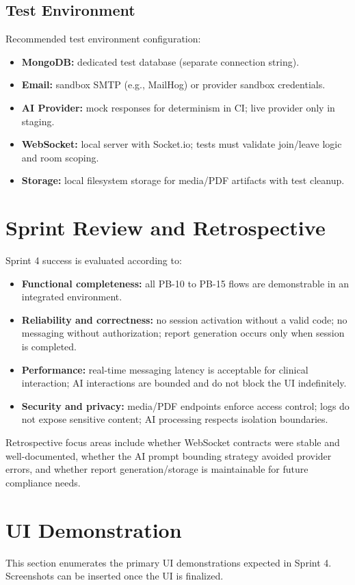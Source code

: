 \documentclass[12pt]{article}
\begin{document}
\subsection{Test Environment}
Recommended test environment configuration:
\begin{itemize}[leftmargin=*]
  \item \textbf{MongoDB:} dedicated test database (separate connection string).
  \item \textbf{Email:} sandbox SMTP (e.g., MailHog) or provider sandbox credentials.
  \item \textbf{AI Provider:} mock responses for determinism in CI; live provider only in staging.
  \item \textbf{WebSocket:} local server with Socket.io; tests must validate join/leave logic and room scoping.
  \item \textbf{Storage:} local filesystem storage for media/PDF artifacts with test cleanup.
\end{itemize}

\section{Sprint Review and Retrospective}
Sprint 4 success is evaluated according to:
\begin{itemize}[leftmargin=*]
  \item \textbf{Functional completeness:} all PB-10 to PB-15 flows are demonstrable in an integrated environment.
  \item \textbf{Reliability and correctness:} no session activation without a valid code; no messaging without authorization; report generation occurs only when session is completed.
  \item \textbf{Performance:} real-time messaging latency is acceptable for clinical interaction; AI interactions are bounded and do not block the UI indefinitely.
  \item \textbf{Security and privacy:} media/PDF endpoints enforce access control; logs do not expose sensitive content; AI processing respects isolation boundaries.
\end{itemize}

Retrospective focus areas include whether WebSocket contracts were stable and well-documented, whether the AI prompt bounding strategy avoided provider errors, and whether report generation/storage is maintainable for future compliance needs.

\section{UI Demonstration}
This section enumerates the primary UI demonstrations expected in Sprint 4. Screenshots can be inserted once the UI is finalized.
\end{document}
